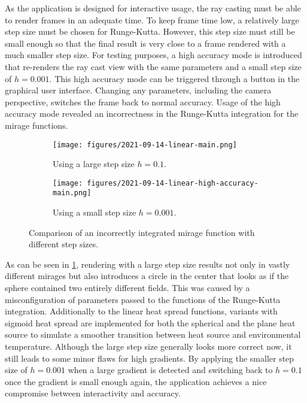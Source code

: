 As the application is designed for interactive usage, the ray casting must be able to render frames in an adequate time.
To keep frame time low, a relatively large step size must be chosen for Runge-Kutta.
However, this step size must still be small enough so that the final result is very close to a frame rendered with a much smaller step size.
For testing purposes, a high accuracy mode is introduced that re-renders the ray cast view with the same parameters and a small step size of $h = 0.001$.
This high accuracy mode can be triggered through a button in the graphical user interface.
Changing any parameters, including the camera perspective, switches the frame back to normal accuracy.
Usage of the high accuracy mode revealed an incorrectness in the Runge-Kutta integration for the mirage functions.
\begin{figure}[!t]
\centering
\begin{subfigure}{0.48\linewidth}
    \texttt{[image: figures/2021-09-14-linear-main.png]}
    \caption{Using a large step size $h = 0.1$.}
\end{subfigure}
\begin{subfigure}{0.48\linewidth}
    \texttt{[image: figures/2021-09-14-linear-high-accuracy-main.png]}
    \caption{Using a small step size $h = 0.001$.}
\end{subfigure}
  \caption{Comparison of an incorrectly integrated mirage function with different step sizes.}
  \label{fig:incorrect-mirage-comparison}
\end{figure}
As can be seen in \cref{fig:incorrect-mirage-comparison}, rendering with a large step size results not only in vastly different mirages but also introduces a circle in the center that looks as if the sphere contained two entirely different fields.
This was caused by a misconfiguration of parameters passed to the functions of the Runge-Kutta integration.
Additionally to the linear heat spread functions, variants with sigmoid heat spread are implemented for both the spherical and the plane heat source to simulate a smoother transition between heat source and environmental temperature.
Although the large step size generally looks more correct now, it still leads to some minor flaws for high gradients.
By applying the smaller step size of $h = 0.001$ when a large gradient is detected and switching back to $h = 0.1$ once the gradient is small enough again, the application achieves a nice compromise between interactivity and accuracy.
